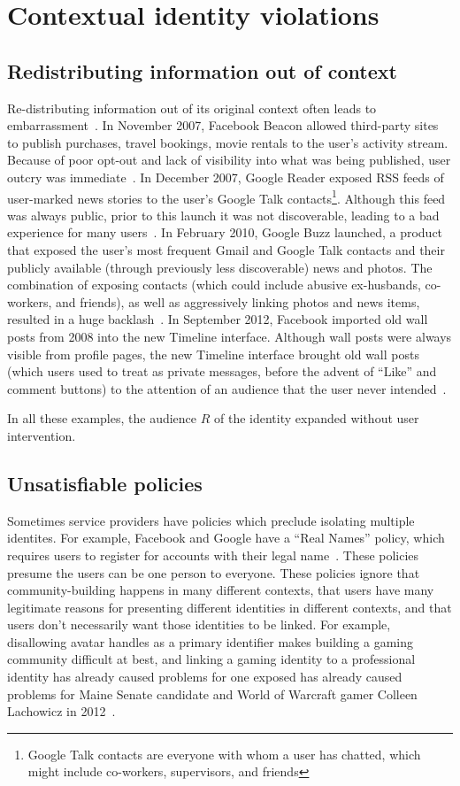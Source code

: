 \documentclass{llncs}
\begin{document}
\section{Contextual identity violations}
\label{sec:examples}
\subsection{Redistributing information out of context}
Re-distributing information out of its original context often leads to
embarrassment~\cite{nissenbaum}.  In November 2007, Facebook Beacon allowed
third-party sites to publish purchases, travel bookings, movie rentals to the
user's activity stream.  Because of poor opt-out and lack of visibility into
what was being published, user outcry was immediate~\cite{mccarthy,nakashima}.
In December 2007, Google Reader exposed RSS feeds of user-marked news stories
to the user's Google Talk contacts\footnote{Google Talk contacts are everyone
with whom a user has chatted, which might include co-workers, supervisors, and
friends}. Although this feed was always public, prior to this launch it was not
discoverable, leading to a bad experience for many users~\cite{helft}. In
February 2010, Google Buzz launched, a product that
exposed the user's most frequent Gmail and Google Talk contacts and their
publicly available (through previously less discoverable) news and photos.  The
combination of exposing contacts (which could include abusive ex-husbands,
co-workers, and friends), as well as aggressively linking photos and news
items, resulted in a huge backlash~\cite{fugitivus,buzz}. In September 2012,
Facebook imported old wall posts from 2008 into the new Timeline interface.
Although wall posts were always visible from profile pages, the new Timeline
interface brought old wall posts (which users used to treat as private
messages, before the advent of ``Like'' and comment buttons) to the attention
of an audience that the user never intended~\cite{timeline}.

In all these examples, the audience $R$ of the identity expanded without user
intervention.

\subsection{Unsatisfiable policies}
Sometimes service providers have policies which preclude isolating multiple
identites. For example, Facebook and Google have a ``Real Names'' policy, which
requires users to register for accounts with their legal
name~\cite{fb_names,google_names}.  These policies presume the users can be one
person to everyone. These policies ignore that community-building happens in
many different contexts, that users have many legitimate reasons for presenting
different identities in different contexts, and that users don't necessarily
want those identities to be linked. For example, disallowing avatar handles as
a primary identifier makes building a gaming community difficult at best, and
linking a gaming identity to a professional identity has already caused
problems for one exposed has already caused problems for Maine Senate candidate
and World of Warcraft gamer Colleen Lachowicz in 2012~\cite{maine}.
\end{document}
